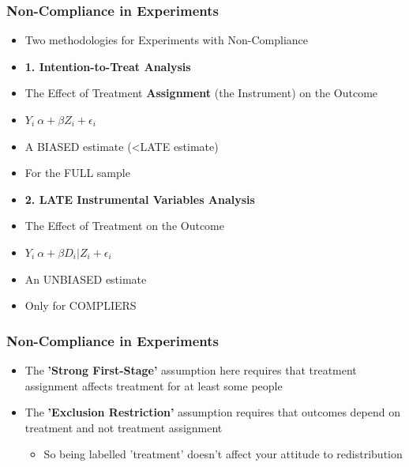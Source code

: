 \documentclass[xcolor=x11names,compress]{beamer}\usepackage[]{graphicx}\usepackage[]{color}
\renewcommand{\(}{\begin{columns}}
\renewcommand{\)}{\end{columns}}
\newcommand{\<}[1]{\begin{column}{#1}}
\renewcommand{\>}{\end{column}}
\begin{document}
\begin{frame}
\frametitle{Non-Compliance in Experiments}
\begin{itemize}
\item Two methodologies for Experiments with Non-Compliance
\end{itemize}
\begin{multicols}{2}
\begin{itemize}
\item \textbf{1. Intention-to-Treat Analysis}
\pause
\item The Effect of Treatment \textbf{Assignment} (the Instrument) on the Outcome
\pause
\item $Y_i ~ \alpha + \beta Z_i + \epsilon_i$
\pause
\item A BIASED estimate (<LATE estimate)
\pause
\item For the FULL sample
\end{itemize}
\columnbreak
\begin{itemize}
\item \textbf{2. LATE Instrumental Variables Analysis}
\pause
\item The Effect of Treatment on the Outcome
\pause
\item $Y_i ~ \alpha + \beta D_i|Z_i + \epsilon_i$
\pause
\item An UNBIASED estimate
\pause
\item Only for COMPLIERS
\end{itemize}
\end{multicols}
\end{frame}

\begin{frame}
\frametitle{Non-Compliance in Experiments}
\begin{itemize}
\item The \textbf{'Strong First-Stage'} assumption here requires that treatment assignment affects treatment for at least some people
\pause
\item The \textbf{'Exclusion Restriction'} assumption requires that outcomes depend on treatment and not treatment assignment
\begin{itemize}
\item So being labelled 'treatment' doesn't affect your attitude to redistribution
\end{itemize}
\end{itemize}
\end{frame}
\end{document}

